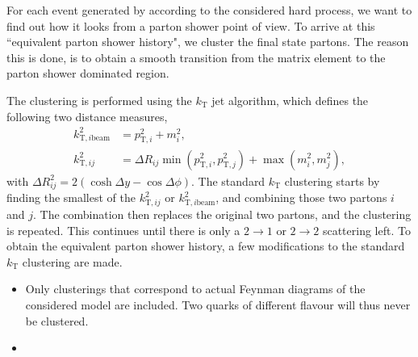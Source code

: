 For each event generated by \MADGRAPH according to the considered hard process, we want to
find out how it looks from a parton shower point of view. To arrive at this ``equivalent parton
shower history", we cluster the final state partons. The reason this is done, is to obtain
a smooth transition from the matrix element to the parton shower dominated region. 

The clustering is performed using the $k_\text{T}$ jet algorithm, which defines the following two
distance measures,
\begin{align}
  k^2_{\mathrm{T},i\text{beam}} &= p_{\mathrm{T},i}^2 + m_i^2, \\ 
  k^2_{\mathrm{T},ij} &= \Delta R_{ij} \min (p_{\mathrm{T},i}^2 , p_{\mathrm{T},j}^2) + \max (m_i^2,
m_j^2),
\end{align}
with $\Delta R^2_{ij} = 2 (\cosh \Delta y - \cos \Delta\phi)$. The standard $k_\text{T}$ clustering
starts by finding the smallest of the $k^2_{\mathrm{T},ij}$ or $k^2_{\mathrm{T},i\text{beam}}$, and
combining those two partons $i$ and $j$. The combination then replaces the original two partons, and
the clustering is repeated. This continues until there is only a $2 \rightarrow 1$ or $2 \rightarrow
2$ scattering left. 
To obtain the equivalent parton shower history, a few modifications to the standard $k_\text{T}$
clustering are made. 
\begin{itemize}
  \item Only clusterings that correspond to actual Feynman diagrams of the considered model are
included. Two quarks of different flavour will thus never be clustered.  
  \item 
\end{itemize}




